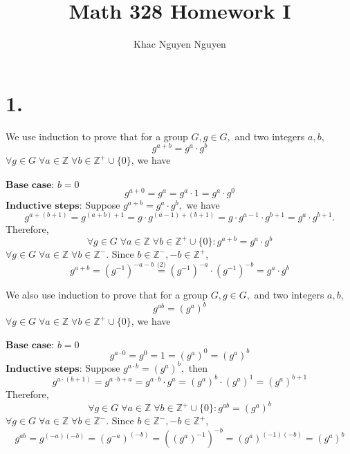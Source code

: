 \documentclass[11pt]{article}
\title{\textbf{Math 328 Homework I}}
\author{Khac Nguyen Nguyen}
\date{}
\begin{document}
	
\section*{1.}
We use induction to prove that for a group $G, g \in G,$ and two integers $a, b$,
\begin{equation*}
g^{a+b} = g^a \cdot g^b 
\end{equation*}
$\forall g \in G \; \forall a \in \mathbb{Z} \; \forall b \in \mathbb{Z}^+ \cup \{0\}$, we have \\~\\
$\textbf{Base case: } b=0$
\[
g^{a+0} = g^a = g^a \cdot 1 = g^a \cdot g^0 
\]
$\textbf{Inductive steps:}$ Suppose $g^{a+b} = g^a \cdot g^b,$ we have  
\[
g^{a+(b+1)} = g^{(a+b)+1} = g \cdot g^{(a-1)+(b+1)} = g \cdot g^{a-1} \cdot g^{b+1} = g^a \cdot g^{b+1}.
\]
Therefore,
\begin{equation*}
\forall g \in G \; \forall a \in \mathbb{Z} \; \forall b \in \mathbb{Z}^+ \cup \{0\}: g^{a+b} = g^a \cdot g^b
\end{equation*}
$\forall g \in G \; \forall a \in \mathbb{Z} \; \forall b \in \mathbb{Z}^-$.
Since $b \in \mathbb{Z}^-, -b \in \mathbb{Z}^+$,
\[
g^{a+b} = (g^{-1})^{-a-b} \stackrel{\text{(2)}}{=} (g^{-1})^{-a} \cdot (g^{-1})^{-b} = g^a \cdot g^b
\]




We also use induction to prove that for a group $G, g \in G,$ and two integers $a, b$,
\begin{equation*}
g^{ab} = (g^a)^b
\end{equation*}
$\forall g \in G \; \forall a \in \mathbb{Z} \; \forall b \in \mathbb{Z}^+ \cup \{0\}$, we have \\~\\
$\textbf{Base case: } b=0$
\[
g^{a \cdot 0} = g^0 = 1 = (g^a)^0 = (g^a)^b
\]
$\textbf{Inductive steps:}$ Suppose $g^{a \cdot b} = (g^a)^b,$ then
\[
g^{a \cdot (b+1)} = g^{a \cdot b + a} = g^{a \cdot b} \cdot g^a = (g^a)^b \cdot (g^a)^1 = (g^a)^{b+1}
\]
Therefore,
\begin{equation*}
\forall g \in G \; \forall a \in \mathbb{Z} \; \forall b \in \mathbb{Z}^+ \cup \{0\}: g^{ab} = (g^a)^b
\end{equation*}
$\forall g \in G \; \forall a \in \mathbb{Z} \; \forall b \in \mathbb{Z}^-$.
Since $b \in \mathbb{Z}^-, -b \in \mathbb{Z}^+$,
\[
g^{ab} = g^{(-a)(-b)} = (g^{-a})^{(-b)} = ((g^a)^{-1})^{-b} = (g^a)^{(-1)(-b)} = (g^a)^b
\]
\end{document}
